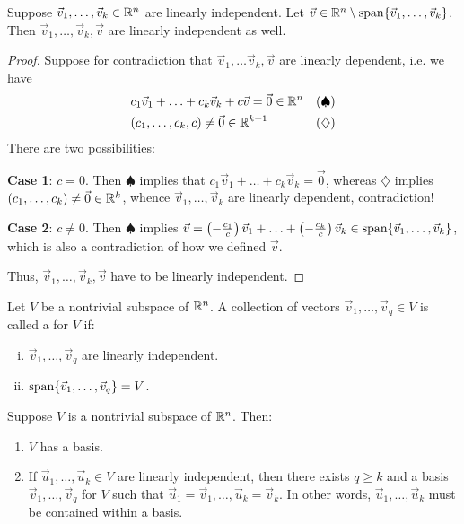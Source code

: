 \documentclass[main.tex]{subfiles}
\begin{document}
\begin{proposition}
    Suppose $\vec{v}_1, \ldots , \vec{v}_k\in \mathbb R^n$ are linearly independent. Let $\vec{v}\in \mathbb R^n\setminus \operatorname{span}\{\vec{v}_1, \ldots , \vec{v}_k\}$. Then $\vec{v}_1, \ldots , \vec{v}_k, \vec{v}$ are linearly independent as well.
\end{proposition}

\begin{proof}
    Suppose for contradiction that $\vec{v}_1, \ldots \vec{v}_k, \vec{v}$ are linearly dependent, i.e. we have
    \begin{align*}
        &c_1\vec{v}_1 + \ldots + c_k\vec{v}_k + c\vec{v} = \vec{0} \in \mathbb R^n && (\spadesuit) \\
        &(c_1, \ldots , c_k, c)\neq \vec{0}\in \mathbb R^{k + 1} && (\diamondsuit)
    \end{align*}
    There are two possibilities:

    \textbf{Case 1}: $c = 0$. Then $\spadesuit$ implies that $c_1\vec{v}_1 + \ldots + c_k\vec{v}_k = \vec{0}$, whereas $\diamondsuit$ implies $(c_1, \ldots , c_k)\neq \vec{0}\in \mathbb R^k$, whence $\vec{v}_1, \ldots , \vec{v}_k$ are linearly dependent, contradiction!

    \textbf{Case 2}: $c \neq 0$. Then $\spadesuit$ implies $\vec{v} = \left(-\frac{c_1}{c}\right)\vec{v}_1 + \ldots + \left(-\frac{c_k}{c}\right)\vec{v}_k\in \operatorname{span}\{\vec{v}_1, \ldots , \vec{v}_k\}$, which is also a contradiction of how we defined $\vec{v}$.

    Thus, $\vec{v}_1, \ldots , \vec{v}_k, \vec{v}$ have to be linearly independent.
\end{proof}

\begin{definition}[Bases]
    Let $V$ be a nontrivial subspace of $\mathbb R^n$. A collection of vectors $\vec{v}_1, \ldots , \vec{v}_q\in V$ is called a  for $V$ if:
    \begin{enumerate}[(i)]
        \item $\vec{v}_1, \ldots , \vec{v}_q$ are linearly independent.
        \item $\operatorname{span}\{\vec{v}_1, \ldots, \vec{v}_q\} = V$.
    \end{enumerate}
\end{definition}

\begin{theorem}
    Suppose $V$ is a nontrivial subspace of $\mathbb R^n$. Then:
    \begin{enumerate}[label = (\alph*)]
        \item $V$ has a basis.
        \item If $\vec{u}_1, \ldots , \vec{u}_k\in V$ are linearly independent, then there exists $q\ge k$ and a basis $\vec{v}_1, \ldots , \vec{v}_q$ for $V$ such that $\vec{u}_1 = \vec{v}_1, \ldots , \vec{u}_k = \vec{v}_k$. In other words, $\vec{u}_1, \ldots , \vec{u}_k$ must be contained within a basis.
    \end{enumerate}
\end{theorem}
\end{document}
